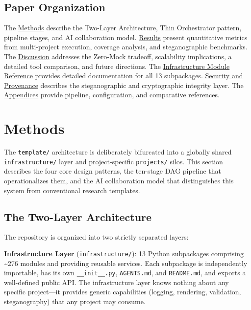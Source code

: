 \documentclass[
]{article}
\begin{document}
\subsection{Paper Organization}\label{paper-organization}

The \href{03a_architecture.md\#methods}{Methods} describe the Two-Layer
Architecture, Thin Orchestrator pattern, pipeline stages, and AI
collaboration model. \href{04_results.md\#results}{Results} present
quantitative metrics from multi-project execution, coverage analysis,
and steganographic benchmarks. The
\href{05a_zeromock_tradeoff.md\#the-zero-mock-tradeoff}{Discussion}
addresses the Zero-Mock tradeoff, scalability implications, a detailed
tool comparison, and future directions. The
\href{06_infrastructure_modules.md\#infrastructure-module-reference}{Infrastructure
Module Reference} provides detailed documentation for all 13
subpackages.
\href{07_security_provenance.md\#security-and-provenance}{Security and
Provenance} describes the steganographic and cryptographic integrity
layer. The
\href{08a_appendix_pipeline.md\#appendix-pipeline}{Appendices} provide
pipeline, configuration, and comparative references.

\newpage

\section{Methods}\label{methods}

The \texttt{template/} architecture is deliberately bifurcated into a
globally shared \texttt{infrastructure/} layer and project-specific
\texttt{projects/} silos. This section describes the four core design
patterns, the ten-stage DAG pipeline that operationalizes them, and the
AI collaboration model that distinguishes this system from conventional
research templates.

\subsection{The Two-Layer
Architecture}\label{the-two-layer-architecture}

The repository is organized into two strictly separated layers:

\textbf{Infrastructure Layer} (\texttt{infrastructure/}): 13 Python
subpackages comprising \textasciitilde276 modules and providing reusable
services. Each subpackage is independently importable, has its own
\texttt{\_\_init\_\_.py}, \texttt{AGENTS.md}, and \texttt{README.md},
and exports a well-defined public API. The infrastructure layer knows
nothing about any specific project---it provides generic capabilities
(logging, rendering, validation, steganography) that any project may
consume.
\end{document}
